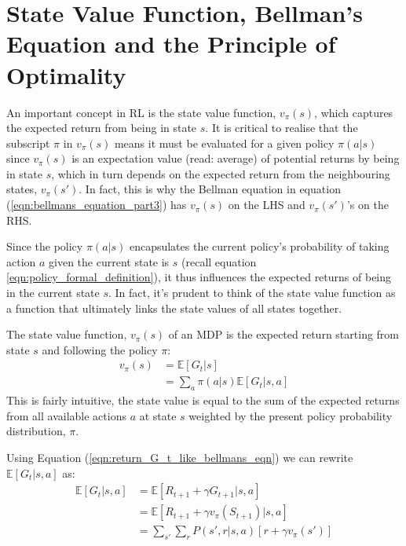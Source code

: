 \documentclass[a4paper,11pt]{article}
\begin{document}
\section{State Value Function, Bellman's Equation and the Principle of Optimality}

An important concept in RL is the state value function, $v_{\pi}(s)$, which captures the expected return from being in state $s$.  It is critical to realise that the subscript $\pi$ in $v_{\pi}(s)$ means it must be evaluated for a given policy $\pi(a|s)$ since $v_{\pi}(s)$ is an expectation value (read: average) of potential returns by being in state $s$, which in turn depends on the expected return from the neighbouring states, $v_{\pi}(s')$.  In fact, this is why the Bellman equation in equation (\ref{eqn:bellmans_equation_part3}) has $v_{\pi}(s)$ on the LHS and $v_{\pi}(s')$'s on the RHS.

Since the policy $\pi(a|s)$ encapsulates the current policy's probability of taking action $a$ given the current state is $s$ (recall equation \ref{eqn:policy_formal_definition}), it thus influences the expected returns of being in the current state $s$.  In fact, it's prudent to think of the state value function as a function that ultimately links the state values of all states together.

The state value function, $v_{\pi}(s)$ of an MDP is the expected return starting from state $s$ and following the policy $\pi$:
\begin{equation} \label{eqn:bellmans_equation_part1}
\begin{split}
        v_\pi (s) &= \mathbb{E}[G_t|s] \\
        &= \sum_{a} \pi(a|s) \mathbb{E} [G_t|s,a]
\end{split}
\end{equation}
This is fairly intuitive, the state value is equal to the sum of the expected returns from all available actions $a$ at state $s$ weighted by the present policy probability distribution, $\pi$.

Using Equation (\ref{eqn:return_G_t_like_bellmans_eqn}) we can rewrite $\mathbb{E} [G_t|s, a]$ as:
\begin{equation} \label{eqn:bellmans_equation_part2}
\begin{split}
        \mathbb{E} [G_t|s, a] &= \mathbb{E} [R_{t+1} + \gamma G_{t+1}|s, a] \\
        &= \mathbb{E} [R_{t+1} + \gamma v_\pi(S_{t+1})|s, a] \\
        &= \sum_{s'} \sum_r P(s',r|s,a) [r + \gamma v_{\pi}(s')]
\end{split}
\end{equation}
\end{document}
